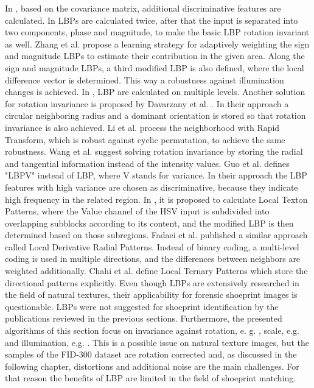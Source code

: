 \documentclass[draft,final]{vutinfth} %
\begin{document}
In \cite{hong2014combining}, based on the covariance matrix, additional discriminative features are calculated. 
In \cite{guo2010completed} LBPs are calculated twice, after that the input is separated into two components, phase and magnitude, to make the basic LBP rotation invariant as well.
Zhang et al.  \cite{zhang2017learning} propose a learning strategy for adaptively weighting the sign and magnitude LBPs to estimate their contribution in the given area. 
Along the sign and magnitude LBPs, a third modified LBP is also defined, where the local difference vector is determined.
This way a robustness against illumination changes is achieved.
In \cite{khellah2011texture}, LBP are calculated on multiple levels.
Another solution for rotation invariance is proposed by Davarzany et al. \cite{davarzani2015scale}. 
In their approach a circular neighboring radius and a dominant orientation is stored so that rotation invariance is also achieved.
Li et al. \cite{li2014rapid} process the neighborhood with Rapid Transform, which is robust against cyclic permutation, to achieve the same robustness.
Wang et al. \cite{wang2017local} suggest solving rotation invariance by storing the radial and tangential information instead of the intensity values.
Guo et al. \cite{guo2010rotation} defines "LBPV" instead of LBP, where V stands for variance. 
In their approach the LBP features with high variance are chosen as discriminative, because they indicate high frequency in the related region.
In \cite{bala2016local}, it is proposed to calculate Local Texton Patterns, where the Value channel of the HSV input is subdivided into overlapping subblocks according to its content, and the modified LBP is then determined based on those subregions.
Fadaei et al. \cite{fadaei2017local} published a similar approach called Local Derivative Radial Patterns.
Instead of binary coding, a multi-level coding is used in multiple directions, and the differences between neighbors are weighted additionally. 
Chahi et al. \cite{chahi2018local} define Local Ternary Patterns which store the directional patterns explicitly.
Even though LBPs are extensively researched in the field of natural textures, their applicability for forensic shoeprint images is questionable.
LBPs were not suggested for shoeprint identification by the publications reviewed in the previous sections.
Furthermore, the presented algorithms of this section focus on invariance against rotation, e. g. \cite{khellah2011texture}, scale, e.g. \cite{davarzani2015scale}  and illumination, e.g. \cite{zhang2017learning}.
This is a possible issue on natural texture images, but the samples of the FID-300 dataset are rotation corrected and, as discussed in the following chapter, distortions and additional noise are the main challenges.
For that reason the benefits of LBP are limited in the field of shoeprint matching.
\end{document}
